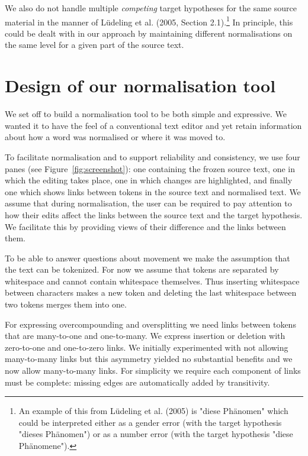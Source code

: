 \documentclass[10pt, a4paper]{article}
\begin{document}
We also do not handle multiple {\em competing} target hypotheses for the same source material in the manner of L{\"u}deling et al. (2005, Section 2.1).\footnote{An example of this from L{\"u}deling et al. (2005) is "diese Ph{\"a}nomen" which could be interpreted either as a gender error (with the target hypothesis "dieses Ph{\"a}nomen") or as a number error (with the target hypothesis "diese Ph{\"a}nomene").} In principle, this could be dealt with in our approach by maintaining different normalisations on the same level for a given part of the source text.

\section{Design of our normalisation tool}
\label{sec:norm_tool}

We set off to build a normalisation tool to be both simple and expressive.
We wanted it to have the feel of a conventional text editor and yet retain
information about how a word was normalised or where it was moved to.

To facilitate normalisation and to support reliability and consistency,
we use four panes (see Figure~\ref{fig:screenshot}): one containing the
frozen source text, one in which the editing takes place, one in which
changes are highlighted, and finally one which shows links between tokens in the source text and normalised text.
We assume that during normalisation, the user can be required to pay attention
to how their edits affect the links between the source text and the target
hypothesis. We facilitate this by providing views of their difference and
the links between them.

To be
able to answer questions about movement we make the assumption that the text
can be tokenized. For now we assume that tokens are separated by whitespace
and cannot contain whitespace themselves. Thus inserting whitespace between
characters makes a new token and deleting the last whitespace between two
tokens merges them into one.

For expressing overcompounding and oversplitting we need links between tokens
that are many-to-one and one-to-many. We express insertion or deletion with
zero-to-one and one-to-zero links. We initially experimented with not allowing
many-to-many links but this asymmetry yielded no substantial benefits
and we now allow many-to-many links.
For simplicity we require each component
of links must be complete: missing edges are automatically added by
transitivity.
\end{document}
